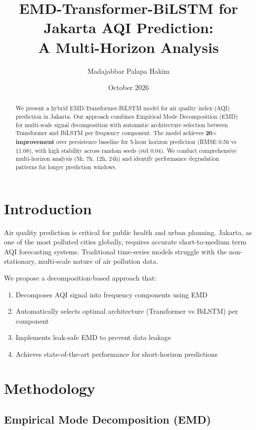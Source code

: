 \documentclass[11pt,a4paper]{article}
\title{EMD-Transformer-BiLSTM for Jakarta AQI Prediction:\\A Multi-Horizon Analysis}
\author{Madajabbar Palapa Hakim}
\date{October 2026}
\begin{document}
\maketitle

\begin{abstract}
We present a hybrid EMD-Transformer-BiLSTM model for air quality index (AQI) prediction in Jakarta. Our approach combines Empirical Mode Decomposition (EMD) for multi-scale signal decomposition with automatic architecture selection between Transformer and BiLSTM per frequency component. The model achieves \textbf{20$\times$ improvement} over persistence baseline for 5-hour horizon prediction (RMSE 0.56 vs 11.08), with high stability across random seeds (std 0.04). We conduct comprehensive multi-horizon analysis (5h, 7h, 12h, 24h) and identify performance degradation patterns for longer prediction windows.
\end{abstract}

\section{Introduction}

Air quality prediction is critical for public health and urban planning. Jakarta, as one of the most polluted cities globally, requires accurate short-to-medium term AQI forecasting systems. Traditional time-series models struggle with the non-stationary, multi-scale nature of air pollution data.

We propose a decomposition-based approach that:
\begin{enumerate}
    \item Decomposes AQI signal into frequency components using EMD
    \item Automatically selects optimal architecture (Transformer vs BiLSTM) per component
    \item Implements leak-safe EMD to prevent data leakage
    \item Achieves state-of-the-art performance for short-horizon predictions
\end{enumerate}

\section{Methodology}

\subsection{Empirical Mode Decomposition (EMD)}
\end{document}
